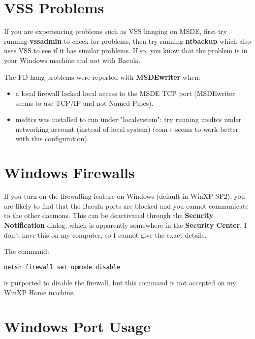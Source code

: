 \section{VSS Problems}

If you are experiencing problems such as VSS hanging on MSDE, first try
running {\bf vssadmin} to check for problems, then try running {\bf
ntbackup} which also uses VSS to see if it has similar problems. If so, you
know that the problem is in your Windows machine and not with Bacula.

The FD hang problems were reported with {\bf MSDEwriter} when:
\begin{itemize}
\item a local firewall locked local access to the MSDE TCP port (MSDEwriter
seems to use TCP/IP and not Named Pipes).  
\item msdtcs was installed to run under "localsystem": try running msdtcs
under  networking account (instead of local system) (com+ seems to work
better with this configuration).
\end{itemize}


\section{Windows Firewalls}

If you turn on the firewalling feature on Windows (default in WinXP SP2), you
are likely to find that the Bacula ports are blocked and you cannot
communicate to the other daemons. This can be deactivated through the {\bf
Security Notification} dialog, which is apparently somewhere in the {\bf
Security Center}. I don't have this on my computer, so I cannot give the exact
details. 

The command: 

\footnotesize
\begin{verbatim}
netsh firewall set opmode disable
\end{verbatim}
\normalsize

is purported to disable the firewall, but this command is not accepted on my
WinXP Home machine. 

\section{Windows Port Usage}

